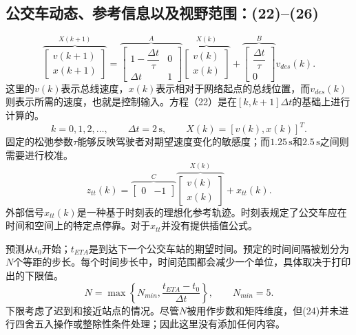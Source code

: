 \documentclass{article}
\begin{document}
\subsection*{公交车动态、参考信息以及视野范围：(22)–(26)}
\begin{equation}
\overbrace{\begin{bmatrix}v(k+1)\\x(k+1)\end{bmatrix}}^{X(k+1)}
=
\overbrace{\begin{bmatrix}1-\dfrac{\Delta t}{\tau}&0\\\Delta t&1\end{bmatrix}}^{A}
\overbrace{\begin{bmatrix}v(k)\\x(k)\end{bmatrix}}^{X(k)}
+
\overbrace{\begin{bmatrix}\dfrac{\Delta t}{\tau}\\0\end{bmatrix}}^{B}
v_{des}(k).
\tag{22}
\end{equation}
这里的\(v(k)\)表示总线速度，\(x(k)\)表示相对于网络起点的总线位置，而\(v_{des}(k)\)则表示所需的速度，也就是控制输入。方程（22）是在\([k,k+1]\Delta t\)的基础上进行计算的。
\[
k=0,1,2,\ldots,\qquad \Delta t=2\,\mathrm{s},\qquad
X(k)=[v(k),x(k)]^T.
\]
固定的松弛参数\(\tau\)能够反映驾驶者对期望速度变化的敏感度；而\(1.25\,\mathrm{s}\)和\(2.5\,\mathrm{s}\)之间则需要进行校准。
\begin{equation}
z_{tt}(k)=
\overbrace{\begin{bmatrix}0&-1\end{bmatrix}}^{C}
\overbrace{\begin{bmatrix}v(k)\\x(k)\end{bmatrix}}^{X(k)}
+x_{tt}(k).
\tag{23}
\end{equation}
外部信号\(x_{tt}(k)\)是一种基于时刻表的理想化参考轨迹。时刻表规定了公交车应在时间和空间上的特定点停靠。对于\(x_{tt}\)并没有提供插值公式。

预测从\(t_0\)开始；\(t_{ETA}\)是到达下一个公交车站的期望时间。预定的时间间隔被划分为\(N\)个等距的步长。每个时间步长中，时间范围都会减少一个单位，具体取决于打印出的下限值。
\begin{equation}
N=\max\left\{N_{min},\frac{t_{ETA}-t_0}{\Delta t}\right\},
\qquad N_{min}=5.
\tag{24}
\end{equation}
下限考虑了迟到和接近站点的情况。尽管\(N\)被用作步数和矩阵维度，但(24)并未进行四舍五入操作或整除性条件处理；因此这里没有添加任何内容。
\end{document}
